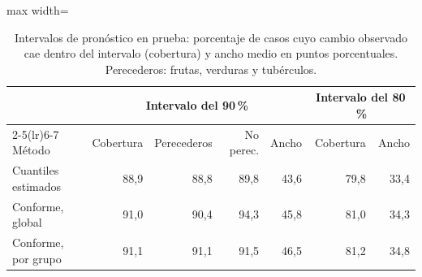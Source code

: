 \begin{table}[htbp]\centering\small
\caption{Intervalos de pronóstico en prueba: porcentaje de casos cuyo cambio observado cae dentro del intervalo (cobertura) y ancho medio en puntos porcentuales. Perecederos: frutas, verduras y tubérculos.}\label{tab:cqr}
\begin{adjustbox}{max width=\textwidth}\begin{tabular}{lrrrrrr}\toprule
& \multicolumn{4}{c}{Intervalo del 90\,\%} & \multicolumn{2}{c}{Intervalo del 80\,\%}\\ \cmidrule(lr){2-5}\cmidrule(lr){6-7}
Método & Cobertura & Perecederos & No perec. & Ancho & Cobertura & Ancho\\ \midrule
Cuantiles estimados & 88{,}9 & 88{,}8 & 89{,}8 & 43{,}6 & 79{,}8 & 33{,}4 \\
Conforme, global & 91{,}0 & 90{,}4 & 94{,}3 & 45{,}8 & 81{,}0 & 34{,}3 \\
Conforme, por grupo & 91{,}1 & 91{,}1 & 91{,}5 & 46{,}5 & 81{,}2 & 34{,}8 \\
\bottomrule\end{tabular}\end{adjustbox}\end{table}
